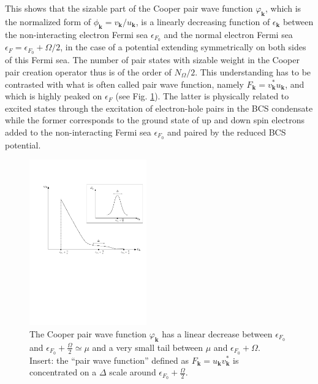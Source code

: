 \documentclass[twocolumn,showpacs]{revtex4}
\def\v#1{\mathbf{#1}}
\begin{document}
 
 This shows that the sizable part of the Cooper pair wave function $\varphi_{\v k}$, which is the normalized form of $\phi_{\v k}=v_{\v k}/u_{\v k}$, is a linearly decreasing function of $\epsilon_{\v k}$ between the non-interacting electron Fermi sea $\epsilon_{F_0}$ and the normal electron Fermi sea  $\epsilon_{F}=\epsilon_{F_0}+\Omega/2$, in the case of a potential extending symmetrically on both sides of this Fermi sea. The number of pair states with sizable weight in the Cooper pair creation operator thus is of the order of $N_\Omega/2$. This understanding  has to be contrasted with what is often called pair wave function, namely $F_{\v k}=v_{\v k}^*u_{\v k}$, and which is highly peaked on $\epsilon_{F}$ (see Fig. \ref{wavfig}). The latter is physically related to excited states through the excitation of electron-hole pairs in the BCS condensate while the former corresponds to the ground state of  up and down spin electrons added to the non-interacting Fermi sea $\epsilon_{F_0}$ and paired by the reduced  BCS potential.
 \begin{figure}[htbp]
\begin{center}
\includegraphics[width=0.45\textwidth]{wave}
\caption{The Cooper pair wave function $\varphi_{\v{k}}$ has a linear decrease between $\epsilon_{F_0}$ and $\epsilon_{F_0}+\frac{\Omega}{2}\simeq\mu$ and a very small tail between $\mu$ and $\epsilon_{F_0}+\Omega$. \\ Insert: the ``pair wave function'' defined as $F_{\v{k}}=u_{\v{k}}v_{\v{k}}^*$ is concentrated on a $\Delta$ scale around   $\epsilon_{F_0}+\frac{\Omega}{2}$.\label{wavfig}} 

\end{center}
\end{figure}
\end{document}
